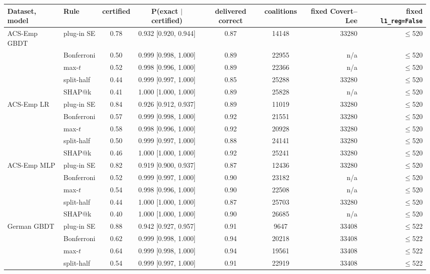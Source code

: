 \begin{tabular}{@{}llccccrr@{}}
\toprule
Dataset, model & Rule & certified & P(exact $\mid$ certified) & delivered correct & coalitions & fixed Covert--Lee & fixed \texttt{l1\_reg=False} \\
\midrule
ACS-Emp GBDT & plug-in SE & 0.78 & 0.932 [0.920, 0.944] & 0.87 & 14148 & 33280 & $\leq$520 \\
 & Bonferroni & 0.50 & 0.999 [0.998, 1.000] & 0.89 & 22955 & n/a & $\leq$520 \\
 & max-$t$ & 0.52 & 0.998 [0.996, 1.000] & 0.89 & 22366 & n/a & $\leq$520 \\
 & split-half & 0.44 & 0.999 [0.997, 1.000] & 0.85 & 25288 & 33280 & $\leq$520 \\
 & SHAP@k & 0.41 & 1.000 [1.000, 1.000] & 0.89 & 25828 & n/a & $\leq$520 \\
\addlinespace[2pt]
ACS-Emp LR & plug-in SE & 0.84 & 0.926 [0.912, 0.937] & 0.89 & 11019 & 33280 & $\leq$520 \\
 & Bonferroni & 0.57 & 0.999 [0.998, 1.000] & 0.92 & 21551 & 33280 & $\leq$520 \\
 & max-$t$ & 0.58 & 0.998 [0.996, 1.000] & 0.92 & 20928 & 33280 & $\leq$520 \\
 & split-half & 0.50 & 0.999 [0.997, 1.000] & 0.88 & 24141 & 33280 & $\leq$520 \\
 & SHAP@k & 0.46 & 1.000 [1.000, 1.000] & 0.92 & 25241 & 33280 & $\leq$520 \\
\addlinespace[2pt]
ACS-Emp MLP & plug-in SE & 0.82 & 0.919 [0.900, 0.937] & 0.87 & 12436 & 33280 & $\leq$520 \\
 & Bonferroni & 0.52 & 0.999 [0.997, 1.000] & 0.90 & 23182 & n/a & $\leq$520 \\
 & max-$t$ & 0.54 & 0.998 [0.996, 1.000] & 0.90 & 22508 & n/a & $\leq$520 \\
 & split-half & 0.44 & 1.000 [1.000, 1.000] & 0.87 & 25703 & 33280 & $\leq$520 \\
 & SHAP@k & 0.40 & 1.000 [1.000, 1.000] & 0.90 & 26685 & n/a & $\leq$520 \\
\addlinespace[2pt]
German GBDT & plug-in SE & 0.88 & 0.942 [0.927, 0.957] & 0.91 & 9647 & 33408 & $\leq$522 \\
 & Bonferroni & 0.62 & 0.999 [0.998, 1.000] & 0.94 & 20218 & 33408 & $\leq$522 \\
 & max-$t$ & 0.64 & 0.999 [0.998, 1.000] & 0.94 & 19561 & 33408 & $\leq$522 \\
 & split-half & 0.54 & 0.999 [0.997, 1.000] & 0.91 & 22919 & 33408 & $\leq$522 \\

\end{tabular}
